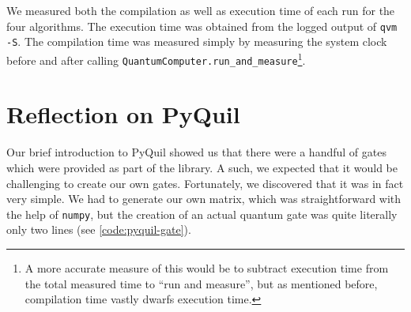 \documentclass[12pt]{article}
\begin{document}
We measured both the compilation as well as execution time of each run for the four algorithms.
The execution time was obtained from the logged output of \texttt{qvm -S}.
The compilation time was measured simply by measuring the system clock before and after calling \texttt{QuantumComputer.run\_and\_measure}\footnote{A more accurate measure of this would be to subtract execution time from the total measured time to ``run and measure'', but as mentioned before, compilation time vastly dwarfs execution time.}.

\section{Reflection on PyQuil}

Our brief introduction to PyQuil showed us that there were a handful of gates which were provided as part of the library.
A such, we expected that it would be challenging to create our own gates.
Fortunately, we discovered that it was in fact very simple.
We had to generate our own matrix, which was straightforward with the help of \texttt{numpy}, but the creation of an actual quantum gate was quite literally only two lines (see \autoref{code:pyquil-gate}).

\end{document}
